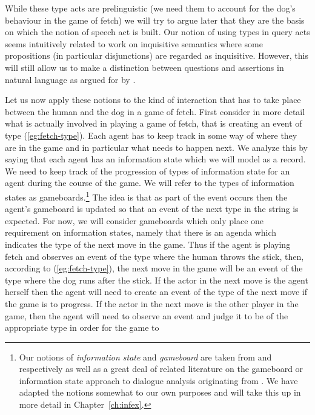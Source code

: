 While these type acts are prelinguistic (we need them to account for
the dog's behaviour in the game of fetch) we will try to argue later
that they are the basis on which the notion of speech act
\citep{Austin1962,Searle1969} is built.  Our notion of using types in
query acts seems intuitively related to work on inquisitive semantics
\citep{GroenendijkRoelofsen2012} where some propositions (in
particular disjunctions) are regarded as inquisitive.  However, this
will still allow us to make a distinction between questions and
assertions in natural language as argued for by \cite{Ginzburg2012}.

Let us now apply these notions to the kind of interaction that has to
take place between the human and the dog in a game of fetch.  First
consider in more detail what is actually involved in playing a game of
fetch, that is creating an event of type (\ref{eg:fetch-type}).  Each
agent has to keep track in some way of where they are in the game and
in particular what needs to happen next.  We analyze this by saying
that each agent has an information state which we will model as a
record.  We need to keep track of the progression of types of
information state for an agent during the course of the game.  We will
refer to the types of information states as gameboards.\footnote{Our
  notions of \textit{information state} and \textit{gameboard} are
  taken from \cite{Larsson2002} and \cite{Ginzburg2012} respectively
  as well as a great deal of related literature on the gameboard or
  information state approach to dialogue analysis originating from
  \cite{Ginzburg1994}.  We have adapted the notions somewhat to our own
  purposes and will take this up in more detail in
  Chapter~\ref{ch:infex}.}  The idea is that as part of the event
occurs then the agent's gameboard is updated so that an event of the
next type in the string is expected.  For now, we will consider
gameboards which only place one requirement on information states,
namely that there is an agenda which indicates the type of the next
move in the game.  Thus if the agent is playing fetch and observes an
event of the type where the human throws the stick, then, according to
(\ref{eg:fetch-type}), the next move in the game will be an event of
the type where the dog runs after the stick.  If the actor in the next
move is the agent herself then the agent will need to create an event
of the type of the next move if the game is to progress.  If the actor in the next move is the
other player in the game, then the agent will need to observe an event
and judge it to be of the appropriate type in order for the game to
